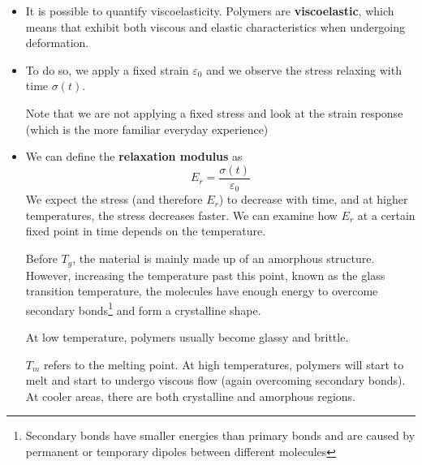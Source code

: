 \begin{itemize}
\begin{proof}
\begin{align}
            \sum_{n=1}^i M_nx_n &\le \sqrt{\sum_{n=1}^i M^2_nx_n}
        \end{align}
        The right hand side gives the RMS average and the left hand side gives the arithmetic average. According to the \href{https://en.wikipedia.org/wiki/HM-GM-AM-QM\_inequalities}{RMS-AM inequality}, the RMS mean is always greater or equal to the arithmetic mean.
    \end{proof}
    This \textbf{disparity} is actually quite important, and is also known as the \textbf{polydisperity index} and is defined as:
    \begin{equation}
        \text{\DJ} = \frac{\overline{M}_\text{weight}}{\overline{M}_\text{number}}
    \end{equation}


    <break>
    <skipped ahead>

    \item It is possible to quantify viscoelasticity. Polymers are \textbf{viscoelastic}, which means that exhibit both viscous and elastic characteristics when undergoing deformation.
    \item To do so, we apply a fixed strain $\varepsilon_0$ and we observe the stress relaxing with time $\sigma(t)$.
    \begin{warning}
        Note that we are not applying a fixed stress and look at the strain response (which is the more familiar everyday experience)
    \end{warning}
    \item We can define the \textbf{relaxation modulus} as
    \begin{equation}
        E_r = \frac{\sigma (t)}{\varepsilon_0} 
    \end{equation}
    We expect the stress (and therefore $E_r$) to decrease with time, and at higher temperatures, the stress decreases faster. We can examine how $E_r$ at a certain fixed point in time depends on the temperature.
    \begin{figure}[ht]
        \centering
    \end{figure}
    Before $T_g$, the material is mainly made up of an amorphous structure. However, increasing the temperature past this point, known as the glass transition temperature, the molecules have enough energy to overcome secondary bonds\footnote{Secondary bonds have smaller energies than primary bonds and are caused by permanent or temporary dipoles between different molecules} and form a crystalline shape.
    \begin{idea}
        At low temperature, polymers usually become glassy and brittle.
    \end{idea}
    $T_m$ refers to the melting point. At high temperatures, polymers will start to melt and start to undergo viscous flow (again overcoming secondary bonds). At cooler areas, there are both crystalline and amorphous regions.
\end{itemize}